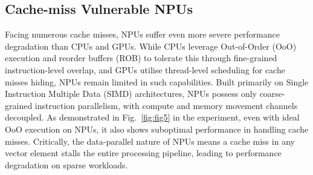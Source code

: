 





\vspace{-5pt}
\subsection{Cache-miss Vulnerable NPUs}%
\vspace{-3pt}

Facing numerous cache misses, NPUs suffer even more severe performance degradation than CPUs and GPUs.
While CPUs leverage Out-of-Order (OoO) execution and reorder buffers (ROB) to tolerate this through fine-grained instruction-level overlap, and GPUs utilise thread-level scheduling for cache misses hiding, NPUs remain limited in such capabilities.
Built primarily on Single Instruction Multiple Data (SIMD) architectures, NPUs possess only coarse-grained instruction parallelism, with compute and memory movement channels decoupled.
As demonstrated in Fig.~\ref{fig:fig5} in the experiment, even with ideal OoO execution on NPUs, it also shows suboptimal performance in handling cache misses.
Critically, the data-parallel nature of NPUs means a cache miss in any vector element stalls the entire processing pipeline, leading to performance degradation on sparse workloads.

